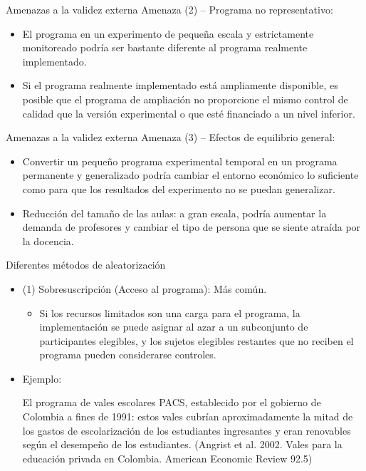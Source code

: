 \documentclass[11pt, aspectratio=169, compress]{beamer}
\begin{document}
\begin{frame}{Amenazas a la validez externa}
	Amenaza (2) -- Programa no representativo:
	
	\begin{itemize}
		\item El programa en un experimento de pequeña escala y estrictamente monitoreado podría ser bastante diferente al programa realmente implementado. 
		
		\item Si el programa realmente implementado está ampliamente disponible, es posible que el programa de ampliación no proporcione el mismo control de calidad que la versión experimental o que esté financiado a un nivel inferior.
	\end{itemize}
\end{frame}
\begin{frame}{Amenazas a la validez externa}
	Amenaza (3) -- Efectos de equilibrio general:
	
	\begin{itemize}
		\item Convertir un pequeño programa experimental temporal en un programa permanente y generalizado podría cambiar el entorno económico lo suficiente como para que los resultados del experimento no se puedan generalizar.
		\item Reducción del tamaño de las aulas: a gran escala, podría aumentar la demanda de profesores y cambiar el tipo de persona que se siente atraída por la docencia.
	\end{itemize}
\end{frame}
\begin{frame}{Diferentes métodos de aleatorización}
	\begin{itemize}
		\item (1) Sobresuscripción (Acceso al programa): Más común. 
		\begin{itemize}
			\item Si los recursos limitados son una carga para el programa, la implementación se puede asignar al azar a un subconjunto de participantes elegibles, y los sujetos elegibles restantes que no reciben el programa pueden considerarse controles.
		\end{itemize}	
		\item Ejemplo: 
		
		El programa de vales escolares PACS, establecido por el gobierno de Colombia a fines de 1991: estos vales cubrían aproximadamente la mitad de los gastos de escolarización de los estudiantes ingresantes y eran renovables según el desempeño de los estudiantes. (Angrist et al. 2002. Vales para la educación privada en Colombia. American Economic Review 92.5)
	\end{itemize}
\end{frame}
\end{document}
